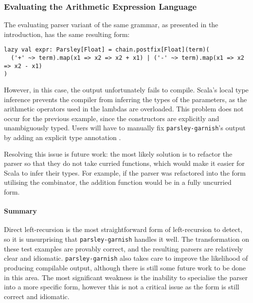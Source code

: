 \documentclass[../../main.tex]{subfiles}
\begin{document}
\subsubsection{Evaluating the Arithmetic Expression Language}
The evaluating parser variant of the same grammar, as presented in the introduction, has the same resulting form:
\begin{verbatim}
lazy val expr: Parsley[Float] = chain.postfix[Float](term)(
  ('+' ~> term).map(x1 => x2 => x2 + x1) | ('-' ~> term).map(x1 => x2 => x2 - x1)
)
\end{verbatim}
%
However, in this case, the output unfortunately fails to compile.
Scala's local type inference prevents the compiler from inferring the types of the  parameters, as the arithmetic operators used in the lambdas are overloaded.
This problem does not occur for the previous example, since the  constructors are explicitly and unambiguously typed.
Users will have to manually fix \texttt{parsley-garnish}'s output by adding an explicit type annotation .

Resolving this issue is future work: the most likely solution is to refactor the parser so that they do not take curried functions, which would make it easier for Scala to infer their types.
For example, if the parser was refactored into the  form utilising the  combinator, the addition function \scala{_ + _} would be in a fully uncurried form.

\paragraph{Summary}
Direct left-recursion is the most straightforward form of left-recursion to detect, so it is unsurprising that \texttt{parsley-garnish} handles it well.
The transformation on these test examples are provably correct, and the resulting parsers are relatively clear and idiomatic.
\texttt{parsley-garnish} also takes care to improve the likelihood of producing compilable output, although there is still some future work to be done in this area.
The most significant weakness is the inability to specialise the  parser into a more specific form, however this is not a critical issue as the  form is still correct and idiomatic.
\end{document}
